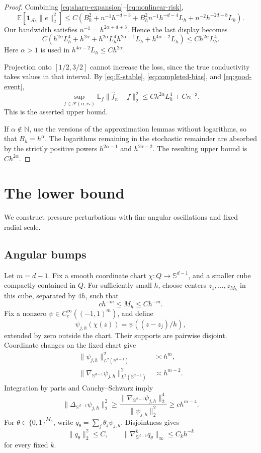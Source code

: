 \documentclass[11pt]{article}
\theoremstyle{remark}
\newcommand{\E}{\mathbb E}
\newcommand{\one}{\mathbf 1}
\newcommand{\cF}{\mathcal F}
\newcommand{\Sph}{\mathbb S^{d-1}}
\begin{document}
\begin{proof}
Combining \eqref{eq:sharp-expansion}--\eqref{eq:nonlinear-risk},
\[
\E[\one_{\mathcal A_h}\|e\|_2^2]
\leq C\left(
B_h^2+n^{-1}h^{-d-3}
+B_h^2n^{-1}h^{-d-4}L_h
+n^{-2}h^{-2d-8}L_h
\right).
\]
Our bandwidth satisfies \(n^{-1}=h^{2\alpha+d+3}\). Hence the last
display becomes
\[
C\left(
h^{2\alpha}L_h^4+h^{2\alpha}
+h^{2\alpha}L_h^4 h^{2\alpha-1}L_h
+h^{4\alpha-2}L_h
\right)
\leq Ch^{2\alpha}L_h^4.
\]
Here \(\alpha>1\) is used in
\(h^{4\alpha-2}L_h\leq Ch^{2\alpha}\).

Projection onto \([1/2,3/2]\) cannot increase the loss, since the
true conductivity takes values in that interval. By
\eqref{eq:E-stable}, \eqref{eq:completed-bias}, and
\eqref{eq:good-event},
\[
\sup_{f\in\cF(\alpha,r_*)}
\E_f\|\widehat f_n-f\|_2^2
\leq Ch^{2\alpha}L_h^4+Cn^{-3}.
\]
This is the asserted upper bound.

If \(\alpha\notin\mathbb N\), use the versions of the approximation
lemmas without logarithms, so that \(B_h=h^\alpha\).
The logarithms remaining in the stochastic remainder are absorbed
by the strictly positive powers \(h^{2\alpha-1}\) and
\(h^{2\alpha-2}\). The resulting upper bound is \(Ch^{2\alpha}\).
\end{proof}

\section{The lower bound}

We construct pressure perturbations with fine angular oscillations
and fixed radial scale.

\subsection{Angular bumps}

Let \(m=d-1\). Fix a smooth coordinate chart
\(\chi:Q\to\Sph\), and a smaller cube compactly contained in \(Q\).
For sufficiently small \(h\), choose centers \(z_1,\ldots,z_{M_h}\)
in this cube, separated by \(4h\), such that
\[
c h^{-m}\leq M_h\leq C h^{-m}.
\]
Fix a nonzero \(\psi\in C^\infty_c((-1,1)^m)\), and define
\[
\psi_{j,h}(\chi(z))=\psi((z-z_j)/h),
\]
extended by zero outside the chart. Their supports are pairwise
disjoint. Coordinate changes on the fixed chart give
\begin{align}
\|\psi_{j,h}\|_{L^2(\Sph)}^2&\asymp h^m,\label{eq:angular-L2}\\
\|\nabla_{\Sph}\psi_{j,h}\|_{L^2(\Sph)}^2&\asymp h^{m-2}.
\label{eq:angular-grad}
\end{align}
Integration by parts and Cauchy--Schwarz imply
\begin{equation}\label{eq:angular-lap}
\|\Delta_{\Sph}\psi_{j,h}\|_2^2
\geq
\frac{\|\nabla_{\Sph}\psi_{j,h}\|_2^4}
{\|\psi_{j,h}\|_2^2}
\geq c h^{m-4}.
\end{equation}
For \(\theta\in\{0,1\}^{M_h}\), write
\(q_\theta=\sum_j\theta_j\psi_{j,h}\).
Disjointness gives
\[
\|q_\theta\|_2^2\leq C,\qquad
\|\nabla_{\Sph}^kq_\theta\|_\infty\leq C_k h^{-k}
\]
for every fixed \(k\).
\end{document}
